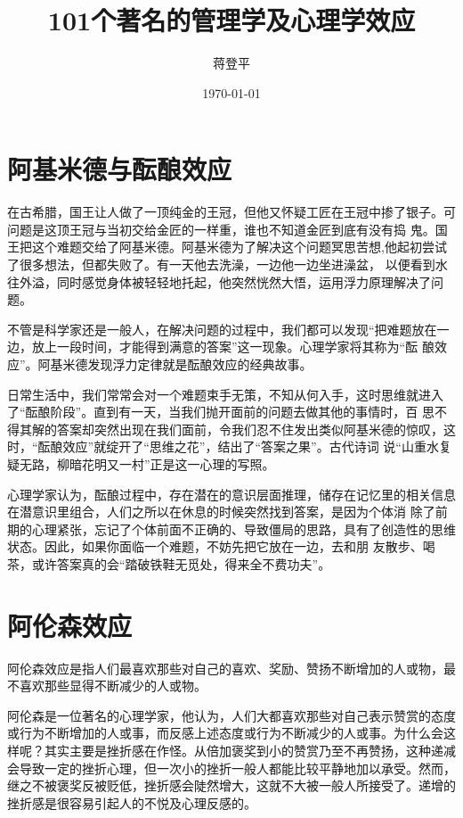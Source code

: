 \documentclass[11pt]{ctexart}
\title{101个著名的管理学及心理学效应}
\author{蒋登平}
\date{\today}
\begin{document}
\maketitle

\setcounter{tocdepth}{3}
\tableofcontents
\vspace*{1cm}
\section{阿基米德与酝酿效应}
\label{sec-1}


在古希腊，国王让人做了一顶纯金的王冠，但他又怀疑工匠在王冠中掺了银子。可问题是这顶王冠与当初交给金匠的一样重，谁也不知道金匠到底有没有捣
鬼。国王把这个难题交给了阿基米德。阿基米德为了解决这个问题冥思苦想,他起初尝试了很多想法，但都失败了。有一天他去洗澡，一边他一边坐进澡盆，
以便看到水往外溢，同时感觉身体被轻轻地托起，他突然恍然大悟，运用浮力原理解决了问题。

不管是科学家还是一般人，在解决问题的过程中，我们都可以发现“把难题放在一边，放上一段时间，才能得到满意的答案”这一现象。心理学家将其称为“酝
酿效应”。阿基米德发现浮力定律就是酝酿效应的经典故事。

日常生活中，我们常常会对一个难题束手无策，不知从何入手，这时思维就进入了“酝酿阶段”。直到有一天，当我们抛开面前的问题去做其他的事情时，百
思不得其解的答案却突然出现在我们面前，令我们忍不住发出类似阿基米德的惊叹，这时，“酝酿效应”就绽开了“思维之花”，结出了“答案之果”。古代诗词
说“山重水复疑无路，柳暗花明又一村”正是这一心理的写照。

心理学家认为，酝酿过程中，存在潜在的意识层面推理，储存在记忆里的相关信息在潜意识里组合，人们之所以在休息的时候突然找到答案，是因为个体消
除了前期的心理紧张，忘记了个体前面不正确的、导致僵局的思路，具有了创造性的思维状态。因此，如果你面临一个难题，不妨先把它放在一边，去和朋
友散步、喝茶，或许答案真的会“踏破铁鞋无觅处，得来全不费功夫”。
\section{阿伦森效应}
\label{sec-2}


阿伦森效应是指人们最喜欢那些对自己的喜欢、奖励、赞扬不断增加的人或物，最不喜欢那些显得不断减少的人或物。

阿伦森是一位著名的心理学家，他认为，人们大都喜欢那些对自己表示赞赏的态度或行为不断增加的人或事，而反感上述态度或行为不断减少的人或事。为什么会这样呢？其实主要是挫折感在作怪。从倍加褒奖到小的赞赏乃至不再赞扬，这种递减会导致一定的挫折心理，但一次小的挫折一般人都能比较平静地加以承受。然而，继之不被褒奖反被贬低，挫折感会陡然增大，这就不大被一般人所接受了。递增的挫折感是很容易引起人的不悦及心理反感的。
\end{document}
